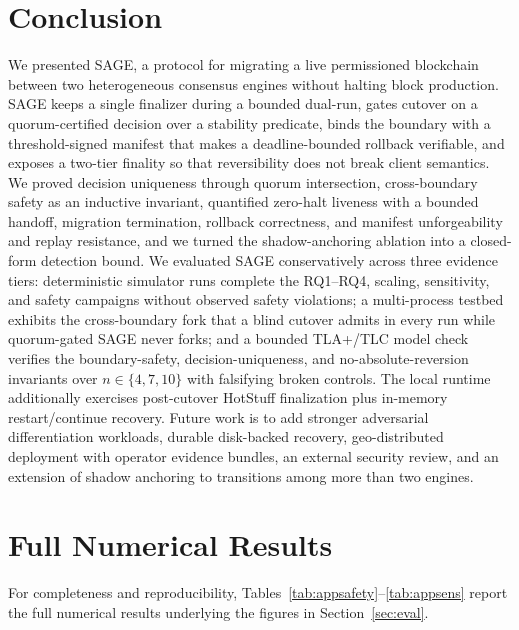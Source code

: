 \documentclass[journal]{IEEEtran}
\begin{document}
\section{Conclusion}
\label{sec:conclusion}
We presented SAGE, a protocol for migrating a live permissioned blockchain between two
heterogeneous consensus engines without halting block production. SAGE keeps a single finalizer
during a bounded dual-run, gates cutover on a quorum-certified decision over a stability
predicate, binds the boundary with a threshold-signed manifest that makes a deadline-bounded
rollback verifiable, and exposes a two-tier finality so that reversibility does not break client
semantics. We proved decision uniqueness through quorum intersection, cross-boundary safety as an
inductive invariant, quantified zero-halt liveness with a bounded handoff, migration termination,
rollback correctness, and manifest unforgeability and replay resistance, and we turned the
shadow-anchoring ablation into a closed-form detection bound. We evaluated SAGE
conservatively across three evidence tiers: deterministic simulator runs
complete the RQ1--RQ4, scaling, sensitivity, and safety campaigns without observed
safety violations; a multi-process testbed exhibits the cross-boundary fork that a blind cutover
admits in every run while quorum-gated SAGE never forks; and a bounded TLA+/TLC model check
verifies the boundary-safety, decision-uniqueness, and no-absolute-reversion invariants over
$n\in\{4,7,10\}$ with falsifying broken controls. The local runtime additionally exercises
post-cutover HotStuff finalization plus in-memory restart/continue recovery. Future work is to
add stronger adversarial differentiation workloads, durable disk-backed recovery,
geo-distributed deployment with operator evidence bundles, an external security review, and an
extension of shadow anchoring to transitions among more than two engines.


\section{Full Numerical Results}
\label{app:data}
For completeness and reproducibility, Tables~\ref{tab:appsafety}--\ref{tab:appsens} report the
full numerical results underlying the figures in Section~\ref{sec:eval}.
\end{document}
